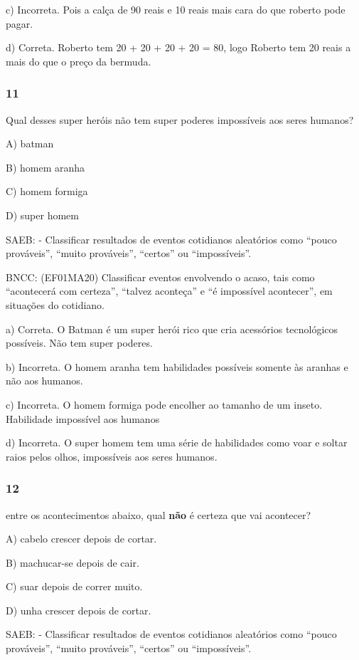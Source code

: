 c) Incorreta. Pois a calça de 90 reais e 10 reais mais cara do que
roberto pode pagar.

d) Correta. Roberto tem 20 + 20 + 20 + 20 = 80, logo Roberto tem 20
reais a mais do que o preço da bermuda.

\subsubsection{11}\label{section-127}

Qual desses super heróis não tem super poderes impossíveis aos seres
humanos?

A) batman

B) homem aranha

C) homem formiga

D) super homem

SAEB: - Classificar resultados de eventos cotidianos aleatórios como
``pouco prováveis'', ``muito prováveis'', ``certos'' ou ``impossíveis''.

BNCC: (EF01MA20) Classificar eventos envolvendo o acaso, tais como
``acontecerá com certeza'', ``talvez aconteça'' e ``é impossível
acontecer'', em situações do cotidiano.

a) Correta. O Batman é um super herói rico que cria acessórios
tecnológicos possíveis. Não tem super poderes.

b) Incorreta. O homem aranha tem habilidades possíveis somente às
aranhas e não aos humanos.

c) Incorreta. O homem formiga pode encolher ao tamanho de um inseto.
Habilidade impossível aos humanos

d) Incorreta. O super homem tem uma série de habilidades como voar e
soltar raios pelos olhos, impossíveis aos seres humanos.

\subsubsection{12}\label{section-128}

entre os acontecimentos abaixo, qual \textbf{não} é certeza que vai
acontecer?

A) cabelo crescer depois de cortar.

B) machucar-se depois de cair.

C) suar depois de correr muito.

D) unha crescer depois de cortar.

SAEB: - Classificar resultados de eventos cotidianos aleatórios como
``pouco prováveis'', ``muito prováveis'', ``certos'' ou ``impossíveis''.

